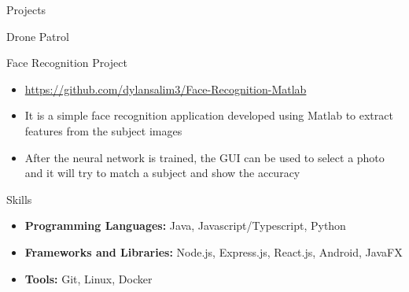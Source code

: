 \documentclass[]{mcdowellcv}
\begin{document}
\begin{cvsection}{Projects}
\begin{cvsubsection}{Drone Patrol}{}{}
\begin{itemize}
		\end{itemize}
	\end{cvsubsection}
	\begin{cvsubsection}{Face Recognition Project}{}{}
		\begin{itemize}
			\item \url{https://github.com/dylansalim3/Face-Recognition-Matlab}
			\item It is a simple face recognition application developed using Matlab to extract features from the subject images
			\item After the neural network is trained, the GUI can be used to select a photo and it will try to match a subject and show the accuracy
		\end{itemize}
	\end{cvsubsection}
\end{cvsection}
\begin{cvsection}{Skills}
	\begin{cvsubsection}{}{}{}
		\begin{itemize}
			\item \textbf{Programming Languages:}  Java, Javascript/Typescript, Python
			\item \textbf{Frameworks and Libraries:}  Node.js, Express.js, React.js, Android, JavaFX
			\item \textbf{Tools:}  Git, Linux, Docker
		\end{itemize}
	\end{cvsubsection}
\end{cvsection}
\end{document}
